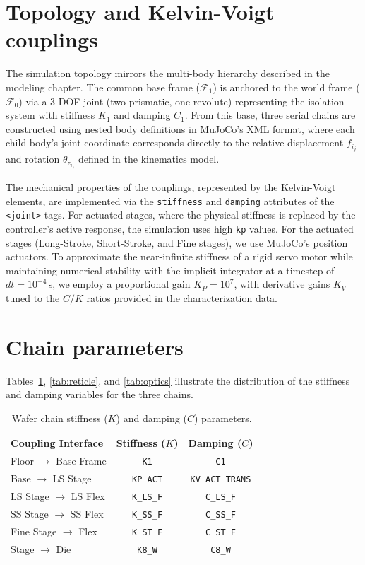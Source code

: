 \documentclass[11pt,letterpaper]{article}
\begin{document}
\section*{Topology and Kelvin-Voigt couplings}

The simulation topology mirrors the multi-body hierarchy described in the modeling chapter. The common base frame ($\mathcal{F}_1$) is anchored to the world frame ($\mathcal{F}_0$) via a 3-DOF joint (two prismatic, one revolute) representing the isolation system with stiffness $K_1$ and damping $C_1$. From this base, three serial chains are constructed using nested body definitions in MuJoCo's XML format, where each child body's joint coordinate corresponds directly to the relative displacement $f_{i_j}$ and rotation $\theta_{z_{i_j}}$ defined in the kinematics model.

The mechanical properties of the couplings, represented by the Kelvin-Voigt elements, are implemented via the \texttt{stiffness} and \texttt{damping} attributes of the \texttt{<joint>} tags. For actuated stages, where the physical stiffness is replaced by the controller's active response, the simulation uses high \texttt{kp} values. For the actuated stages (Long-Stroke, Short-Stroke, and Fine stages), we use MuJoCo's position actuators. To approximate the near-infinite stiffness of a rigid servo motor while maintaining numerical stability with the implicit integrator at a timestep of $dt = 10^{-4}$\,s, we employ a proportional gain $K_P = 10^7$, with derivative gains $K_V$ tuned to the $C/K$ ratios provided in the characterization data.

\section*{Chain parameters}

Tables~\ref{tab:wafer}, \ref{tab:reticle}, and \ref{tab:optics} illustrate the distribution of the stiffness and damping variables for the three chains.

\begin{table}[H]
\centering
\caption{Wafer chain stiffness ($K$) and damping ($C$) parameters.}
\label{tab:wafer}
\begin{tabular}{lcc}
\toprule
Coupling Interface & Stiffness ($K$) & Damping ($C$) \\
\midrule
Floor $\rightarrow$ Base Frame  & \texttt{K1}       & \texttt{C1} \\
Base $\rightarrow$ LS Stage     & \texttt{KP\_ACT}  & \texttt{KV\_ACT\_TRANS} \\
LS Stage $\rightarrow$ LS Flex  & \texttt{K\_LS\_F} & \texttt{C\_LS\_F} \\
SS Stage $\rightarrow$ SS Flex  & \texttt{K\_SS\_F} & \texttt{C\_SS\_F} \\
Fine Stage $\rightarrow$ Flex   & \texttt{K\_ST\_F} & \texttt{C\_ST\_F} \\
Stage $\rightarrow$ Die         & \texttt{K8\_W}    & \texttt{C8\_W} \\
\bottomrule
\end{tabular}
\end{table}
\end{document}

